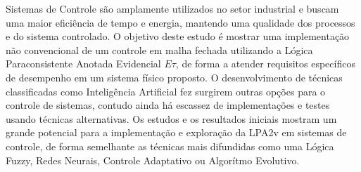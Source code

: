





Sistemas de Controle são amplamente utilizados no setor industrial e buscam uma maior eficiência de tempo e energia, mantendo uma qualidade dos processos e do sistema controlado.
O objetivo deste estudo é mostrar uma implementação não convencional de um controle em malha fechada utilizando a Lógica Paraconsistente Anotada Evidencial $E\tau$, de forma a atender requisitos específicos de desempenho em um sistema físico proposto.
O desenvolvimento de técnicas classificadas como Inteligência Artificial fez surgirem outras opções para o controle de sistemas, contudo ainda há escassez de implementações e testes usando técnicas alternativas.
Os estudos e os resultados iniciais mostram um grande potencial para a implementação e exploração da LPA2v em sistemas de controle, de forma semelhante as técnicas mais difundidas como uma Lógica Fuzzy, Redes Neurais, Controle Adaptativo ou Algorítmo Evolutivo.


